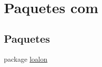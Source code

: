 \hypertarget{namespacecom}{}\section{Paquetes com}
\label{namespacecom}
\subsection*{Paquetes}
\begin{DoxyCompactItemize}
\item 
package \mbox{\hyperlink{namespacecom_1_1loalon}{loalon}}
\end{DoxyCompactItemize}
